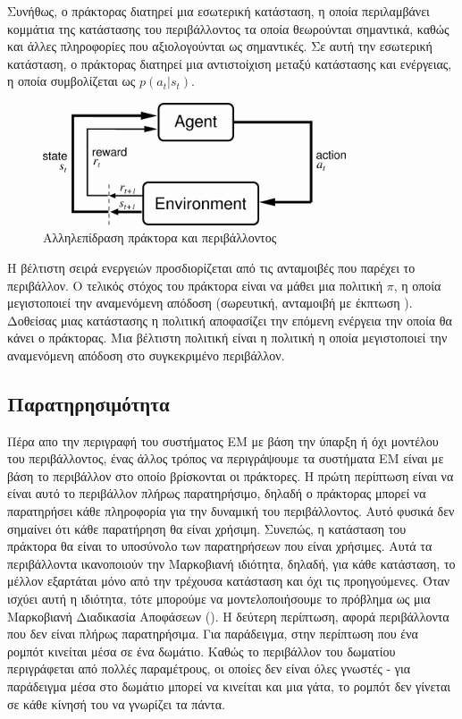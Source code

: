 Συνήθως, ο πράκτορας διατηρεί μια εσωτερική κατάσταση, η οποία περιλαμβάνει κομμάτια της κατάστασης του περιβάλλοντος τα οποία θεωρούνται
σημαντικά, καθώς και άλλες πληροφορίες που αξιολογούνται ως σημαντικές. Σε αυτή την εσωτερική κατάσταση, ο πράκτορας
διατηρεί μια αντιστοίχιση μεταξύ κατάστασης και ενέργειας, η οποία συμβολίζεται ως $p(a_t | s_t)$.

\begin{figure}[ht]
    \includegraphics[width=0.8\textwidth]{body_matter/reinforcement_learning/images/agent_environment.png}
    \Centering
    \caption{Αλληλεπίδραση πράκτορα και περιβάλλοντος}
    \label{fig:agent_environment}
\end{figure}


Η βέλτιστη σειρά ενεργειών προσδιορίζεται από τις ανταμοιβές που παρέχει το περιβάλλον. Ο τελικός στόχος του πράκτορα είναι να μάθει μια
πολιτική $π$, η οποία μεγιστοποιεί την αναμενόμενη απόδοση (σωρευτική, ανταμοιβή με έκπτωση ). Δοθείσας μιας κατάστασης
η πολιτική αποφασίζει την επόμενη ενέργεια την οποία θα κάνει ο πράκτορας. Μια βέλτιστη πολιτική είναι η πολιτική η οποία μεγιστοποιεί
την αναμενόμενη απόδοση στο συγκεκριμένο περιβάλλον.


\subsection{Παρατηρησιμότητα}

Πέρα απο την περιγραφή του συστήματος ΕΜ με βάση την ύπαρξη ή όχι μοντέλου του περιβάλλοντος, ένας
άλλος τρόπος να περιγράψουμε τα συστήματα ΕΜ είναι με βάση το περιβάλλον στο οποίο βρίσκονται οι πράκτορες.
Η πρώτη περίπτωση είναι να είναι αυτό το περιβάλλον πλήρως παρατηρήσιμο, δηλαδή ο πράκτορας μπορεί να παρατηρήσει κάθε πληροφορία για την δυναμική του περιβάλλοντος.
Αυτό φυσικά δεν σημαίνει ότι κάθε παρατήρηση θα είναι χρήσιμη. Συνεπώς, η κατάσταση του πράκτορα θα είναι το υποσύνολο των παρατηρήσεων που είναι χρήσιμες.
Αυτά τα περιβάλλοντα ικανοποιούν την Μαρκοβιανή ιδιότητα, δηλαδή, για κάθε κατάσταση, το μέλλον εξαρτάται μόνο από
την τρέχουσα κατάσταση και όχι τις προηγούμενες. Όταν ισχύει αυτή η ιδιότητα, τότε μπορούμε να μοντελοποιήσουμε το πρόβλημα ως μια
Μαρκοβιανή Διαδικασία Αποφάσεων (). Η δεύτερη περίπτωση, αφορά περιβάλλοντα που δεν είναι πλήρως
παρατηρήσιμα. Για παράδειγμα, στην περίπτωση που ένα ρομπότ κινείται μέσα σε ένα δωμάτιο. Καθώς το περιβάλλον του δωματίου περιγράφεται
από πολλές παραμέτρους, οι οποίες δεν είναι όλες γνωστές - για παράδειγμα μέσα στο δωμάτιο μπορεί να κινείται και μια γάτα,
το ρομπότ δεν γίνεται σε κάθε κίνησή του να γνωρίζει τα πάντα.


